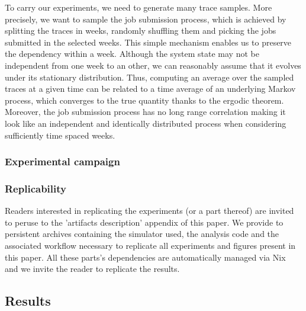 \documentclass[sigconf]{acmart}
\begin{document}

To carry our experiments, we need to generate many trace samples. More precisely, we want
to sample the job submission process, which is achieved by splitting the traces in weeks,
randomly shuffling them and picking the jobs submitted in the selected weeks.  This simple
mechanism enables us to preserve the dependency within a week. Although the system state
may not be independent from one week to an other, we can reasonably assume that it evolves
under its stationary distribution. Thus, computing an average over the sampled traces at a
given time can be related to a time average of an underlying Markov process, which
converges to the true quantity thanks to the ergodic theorem.  Moreover, the job
submission process has no long range correlation making it look like an independent and
identically distributed process when considering sufficiently time spaced weeks.

\subsubsection{Experimental campaign}


\subsubsection{Replicability}

Readers interested in replicating the experiments (or a part thereof) are
invited to peruse to the 'artifacts description' appendix of this paper.  We
provide to persistent archives containing the simulator used, the analysis code
and the associated workflow necessary to replicate all experiments and figures
present in this paper. All these parts's dependencies are automatically managed
via Nix~\cite{nix} and we invite the reader to replicate the results.

\subsection{Results}
\label{sub:results}
\end{document}
